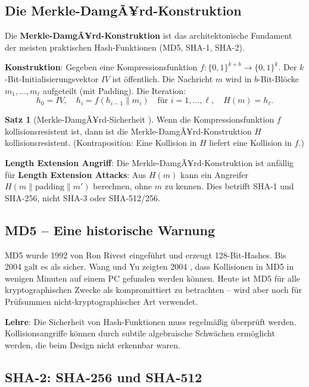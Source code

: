 ﻿\documentclass[a4paper,12pt]{scrreprt}
\theoremstyle{definition}
\newtheorem{satz}{Satz}[section]
\begin{document}
\subsection{Die Merkle-DamgÃ¥rd-Konstruktion}

Die \textbf{Merkle-DamgÃ¥rd-Konstruktion} \cite{Dam89,Mer89} ist das architektonische Fundament der meisten praktischen Hash-Funktionen (MD5, SHA-1, SHA-2).

\textbf{Konstruktion}: Gegeben eine Kompressionsfunktion $f: \{0,1\}^{k+b} \to \{0,1\}^k$. Der $k$-Bit-Initialisierungsvektor $IV$ ist öffentlich. Die Nachricht $m$ wird in $b$-Bit-Blöcke $m_1,\ldots,m_\ell$ aufgeteilt (mit Padding). Die Iteration:
\[
h_0 = IV, \quad h_i = f(h_{i-1} \| m_i) \quad \text{für } i = 1,\ldots,\ell, \quad H(m) = h_\ell.
\]

\begin{satz}[Merkle-DamgÃ¥rd-Sicherheit \cite{Dam89,Mer89}]
Wenn die Kompressionsfunktion $f$ kollisionsresistent ist, dann ist die Merkle-DamgÃ¥rd-Konstruktion $H$ kollisionsresistent. (Kontraposition: Eine Kollision in $H$ liefert eine Kollision in $f$.)
\end{satz}

\textbf{Length Extension Angriff}: Die Merkle-DamgÃ¥rd-Konstruktion ist anfällig für \textbf{Length Extension Attacks}: Aus $H(m)$ kann ein Angreifer $H(m \| \text{padding} \| m')$ berechnen, ohne $m$ zu kennen. Dies betrifft SHA-1 und SHA-256, nicht SHA-3 oder SHA-512/256.

\subsection{MD5 -- Eine historische Warnung}

MD5 wurde 1992 von Ron Rivest eingeführt und erzeugt 128-Bit-Hashes. Bis 2004 galt es als sicher. Wang und Yu zeigten 2004 \cite{WY05}, dass Kollisionen in MD5 in wenigen Minuten auf einem PC gefunden werden können. Heute ist MD5 für alle kryptographischen Zwecke als kompromittiert zu betrachten -- wird aber noch für Prüfsummen nicht-kryptographischer Art verwendet.

\textbf{Lehre}: Die Sicherheit von Hash-Funktionen muss regelmäßig überprüft werden. Kollisionsangriffe können durch subtile algebraische Schwächen ermöglicht werden, die beim Design nicht erkennbar waren.

\subsection{SHA-2: SHA-256 und SHA-512}
\end{document}

